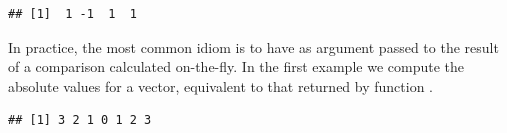 \documentclass[krantz2]{krantz}\usepackage{knitr}%
\begin{document}
\begin{knitrout}\footnotesize
{}\color{fgcolor}\begin{kframe}
\begin{alltt}
 \hlkwb{<-} \hlstd{(}\hlstd{,} \hlstd{,} \hlstd{,} \hlstd{)}
\hlstd{(}   \hlstd{=} \hlstd{,}  \hlstd{=} \hlopt{-}\hlstd{)}
\end{alltt}
\begin{verbatim}
## [1]  1 -1  1  1
\end{verbatim}
\end{kframe}
\end{knitrout}

In practice, the most common idiom is to have as argument passed to  the result of a comparison calculated on-the-fly. In the first example we compute the absolute values for a vector, equivalent to that returned by \Rlang function .

\begin{knitrout}\footnotesize
{}\color{fgcolor}\begin{kframe}
\begin{alltt}
 \hlkwb{<-} \hlopt{-}\hlopt{:+}
 \hlopt{<} \hlstd{,} \hlopt{-}
\end{alltt}
\begin{verbatim}
## [1] 3 2 1 0 1 2 3
\end{verbatim}
\end{kframe}
\end{knitrout}
\end{document}
